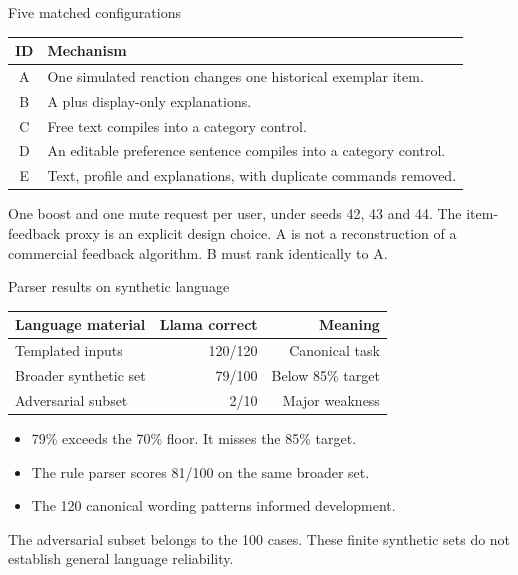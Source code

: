 \documentclass[10pt]{beamer}
\newcommand{\toprule}{\hline}
\newcommand{\midrule}{\hline}
\newcommand{\bottomrule}{\hline}
\newcommand{\src}[1]{\vfill{\tiny\color{bcitgray}#1}}
\begin{document}
\begin{frame}{Five matched configurations}
\small
\begin{tabular}{@{}cP{8.9cm}@{}}
\toprule
ID & Mechanism\\\midrule
A & One simulated reaction changes one historical exemplar item.\\[0.15cm]
B & A plus display-only explanations.\\[0.15cm]
C & Free text compiles into a category control.\\[0.15cm]
D & An editable preference sentence compiles into a category control.\\[0.15cm]
E & Text, profile and explanations, with duplicate commands removed.\\\bottomrule
\end{tabular}\par
\vspace{0.25cm}
One boost and one mute request per user, under seeds 42, 43 and 44. The item-feedback proxy is an explicit design choice.
\src{A is not a reconstruction of a commercial feedback algorithm. B must rank identically to A.}
\end{frame}

\begin{frame}{Parser results on synthetic language}
\begin{tabular}{@{}lrr@{}}
\toprule
Language material & Llama correct & Meaning\\\midrule
Templated inputs & 120/120 & Canonical task\\
Broader synthetic set & 79/100 & Below 85\% target\\
Adversarial subset & 2/10 & Major weakness\\\bottomrule
\end{tabular}\par
\vspace{0.3cm}
\begin{itemize}
\item 79\% exceeds the 70\% floor. It misses the 85\% target.
\item The rule parser scores 81/100 on the same broader set.
\item The 120 canonical wording patterns informed development.
\end{itemize}
\src{The adversarial subset belongs to the 100 cases. These finite synthetic sets do not establish general language reliability.}
\end{frame}
\end{document}
